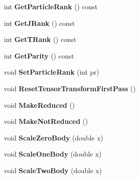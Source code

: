 \begin{DoxyCompactItemize}
\item 
int {\bfseries Get\+Particle\+Rank} () const \hypertarget{classOperator_a16a917d45b7d8c03868b6cd80b9efe7f}{}\label{classOperator_a16a917d45b7d8c03868b6cd80b9efe7f}

\item 
int {\bfseries Get\+J\+Rank} () const \hypertarget{classOperator_a5f12467caae7d72bad32ea5b7c378899}{}\label{classOperator_a5f12467caae7d72bad32ea5b7c378899}

\item 
int {\bfseries Get\+T\+Rank} () const \hypertarget{classOperator_af01419ad8d7a4097f5520ae6d533e93f}{}\label{classOperator_af01419ad8d7a4097f5520ae6d533e93f}

\item 
int {\bfseries Get\+Parity} () const \hypertarget{classOperator_a7b3d8e2ca9f0ba631b59220cf04dbe39}{}\label{classOperator_a7b3d8e2ca9f0ba631b59220cf04dbe39}

\item 
void {\bfseries Set\+Particle\+Rank} (int pr)\hypertarget{classOperator_a77eb97b1309a1c4e20101217903b9771}{}\label{classOperator_a77eb97b1309a1c4e20101217903b9771}

\item 
void {\bfseries Reset\+Tensor\+Transform\+First\+Pass} ()\hypertarget{classOperator_a64093adebbc555b8cc0c092c15ad1386}{}\label{classOperator_a64093adebbc555b8cc0c092c15ad1386}

\item 
void {\bfseries Make\+Reduced} ()\hypertarget{classOperator_ad2ec2d4cf6d17b1b7b7afc86bc03c6ed}{}\label{classOperator_ad2ec2d4cf6d17b1b7b7afc86bc03c6ed}

\item 
void {\bfseries Make\+Not\+Reduced} ()\hypertarget{classOperator_add4e26b5eb6534daed5cd40899456ed0}{}\label{classOperator_add4e26b5eb6534daed5cd40899456ed0}

\item 
void {\bfseries Scale\+Zero\+Body} (double x)\hypertarget{classOperator_a3a25803bc77344396f2dd0e75d2a020d}{}\label{classOperator_a3a25803bc77344396f2dd0e75d2a020d}

\item 
void {\bfseries Scale\+One\+Body} (double x)\hypertarget{classOperator_a5466cc965277b75b14b60918f4d652ab}{}\label{classOperator_a5466cc965277b75b14b60918f4d652ab}

\item 
void {\bfseries Scale\+Two\+Body} (double x)\hypertarget{classOperator_af1f244c4856d11c21f94b6c6cd24a555}{}\label{classOperator_af1f244c4856d11c21f94b6c6cd24a555}


\end{DoxyCompactItemize}
